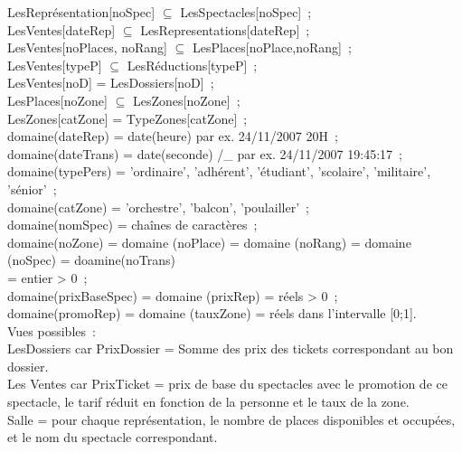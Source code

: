 \documentclass[a4paper, 10pt, twoside]{article}
\begin{document}
  \noindent LesReprésentation[noSpec] $\subseteq$ LesSpectacles[noSpec]~;\\
  LesVentes[dateRep] $\subseteq$ LesRepresentations[dateRep]~;\\
  LesVentes[noPlaces, noRang] $\subseteq$ LesPlaces[noPlace,noRang]~;\\
  LesVentes[typeP] $\subseteq$ LesRéductions[typeP]~;\\
  LesVentes[noD] = LesDossiers[noD]~;\\
  LesPlaces[noZone] $\subseteq$ LesZones[noZone]~;\\
  LesZones[catZone] = TypeZones[catZone]~;\\
  domaine(dateRep) = date(heure) par ex. 24/11/2007 20H~;\\
  domaine(dateTrans) = date(seconde) /\_ par ex. 24/11/2007 19:45:17~;\\
  domaine(typePers) = {’ordinaire’, ’adhérent’, ’étudiant’, ’scolaire’, ’militaire’, ’sénior’}~;\\
  domaine(catZone) = {’orchestre’, ’balcon’, ’poulailler’}~;\\
  domaine(nomSpec) = chaînes de caractères~;\\
  domaine(noZone) = domaine (noPlace) = domaine (noRang) = domaine (noSpec) = doamine(noTrans)\\= entier > 0~;\\
  domaine(prixBaseSpec) = domaine (prixRep) = réels > 0~;\\
  domaine(promoRep) = domaine (tauxZone) = réels dans l’intervalle [0;1].\\

  \noindent Vues possibles~:\\
  LesDossiers car PrixDossier = Somme des prix des tickets correspondant au bon dossier.\\
  Les Ventes car PrixTicket = prix de base du spectacles avec le promotion de ce spectacle, le tarif réduit en fonction de la personne et le taux de la zone.\\
  Salle = pour chaque représentation, le nombre de places disponibles et occupées, et le nom du spectacle correspondant.\\
\end{document}

